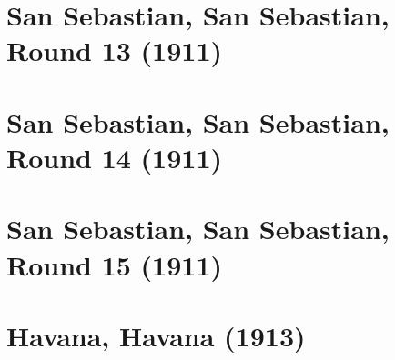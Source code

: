 \documentclass[11pt]{article}
\begin{document}
\clearpage

\section{San Sebastian, San Sebastian, Round 13 (1911)}


\clearpage

\section{San Sebastian, San Sebastian, Round 14 (1911)}


\clearpage

\section{San Sebastian, San Sebastian, Round 15 (1911)}


\clearpage

\section{Havana, Havana (1913)}


\clearpage



\clearpage



\clearpage



\clearpage



\clearpage



\clearpage



\clearpage



\clearpage



\clearpage



\clearpage



\clearpage



\clearpage
\end{document}
